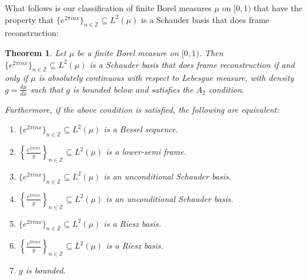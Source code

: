 \documentclass[11pt]{amsart}
\newtheorem{thm}{Theorem}[section]
\theoremstyle{definition}
\numberwithin{equation}{section}
\begin{document}
What follows is our classification of finite Borel measures $\mu$ on $[0,1)$ that have the property that $\{ e^{2 \pi i n x} \}_{n \in \mathbb{Z}} \subseteq L^2(\mu)$ is a Schauder basis that does frame reconstruction:
\begin{thm}
Let $\mu$ be a finite Borel measure on $[0,1)$. Then $\{e^{2\pi i n x}\}_{n\in\mathbb{Z}} \subseteq L^{2}(\mu)$ is a Schauder basis that does frame reconstruction if and only if $\mu$ is absolutely continuous with respect to Lebesgue measure, with density $g = \tfrac{d\mu}{dx}$ such that $g$ is bounded below and satisfies the $A_{2}$ condition.

Furthermore, if the above condition is satisfied, the following are equivalent:
\begin{enumerate}
    \item $\{ e^{2 \pi i n x} \}_{n \in \mathbb{Z}} \subseteq L^2(\mu)$ is a Bessel sequence.
    \item $\left\{\frac{e^{2\pi i nx}}{g} \right\}_{n\in \mathbb{Z}}\subseteq L^2(\mu)$ is a lower-semi frame.
    \item $\{ e^{2 \pi i n x} \}_{n \in \mathbb{Z}} \subseteq L^2(\mu)$ is an unconditional Schauder basis.
     \item $\left\{\frac{e^{2\pi i nx}}{g} \right\}_{n\in \mathbb{Z}}\subseteq L^2(\mu)$ is an unconditional Schauder basis.
    \item $\{ e^{2 \pi i n x} \}_{n \in \mathbb{Z}} \subseteq L^2(\mu)$ is a Riesz basis.
    \item $\left\{\frac{e^{2\pi i nx}}{g} \right\}_{n\in \mathbb{Z}}\subseteq L^2(\mu)$ is a Riesz basis.
    \item $g$ is bounded.
\end{enumerate}

\end{thm}
\end{document}
